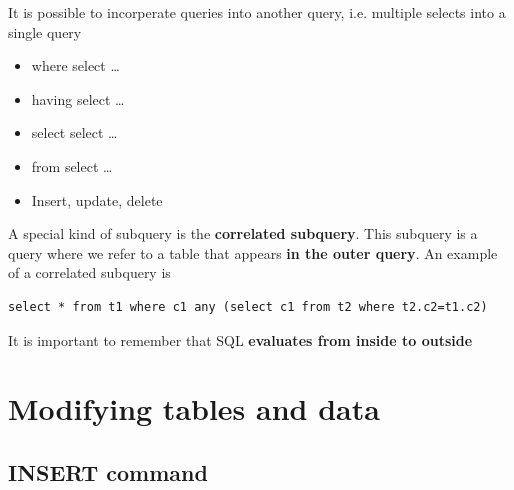 \documentclass{article}
\begin{document}
It is possible to incorperate queries into another query, i.e. multiple selects into a single query 
\begin{itemize}
    \item where select \dots
    \item having select \dots
    \item select select \dots
    \item from select \dots
    \item Insert, update, delete 
\end{itemize}
A special kind of subquery is the \textbf{correlated subquery}. This subquery is a query where we refer to a table that appears \textbf{in the outer query}.
An example of a correlated subquery is 
\begin{lstlisting}[frame=single]
    select * from t1 where c1 any (select c1 from t2 where t2.c2=t1.c2)
\end{lstlisting}
It is important to remember that SQL \textbf{evaluates from inside to outside}

\section{Modifying tables and data}

\subsection{INSERT command}
\end{document}
